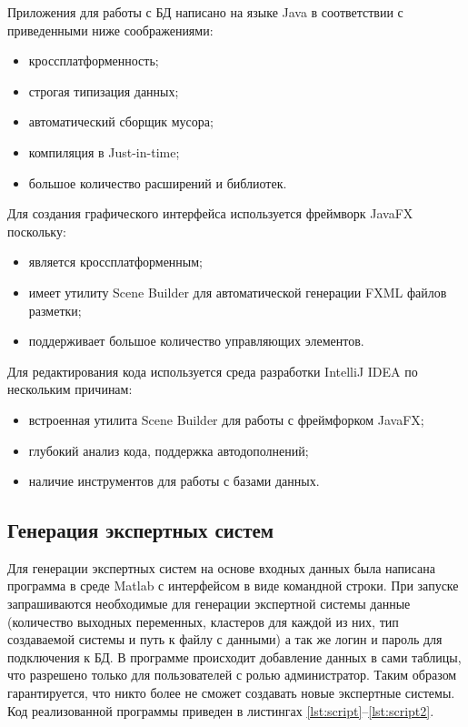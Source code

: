Приложения для работы с БД написано на языке Java \cite{Java} в соответствии с приведенными ниже соображениями:
\begin{itemize}
	\item кроссплатформенность;
	\item строгая типизация данных;
	\item автоматический сборщик мусора;
	\item компиляция в Just-in-time;
	\item большое количество расширений и библиотек.
\end{itemize}

Для создания графического интерфейса используется фреймворк JavaFX поскольку:
\begin{itemize}
	\item является кроссплатформенным;
	\item имеет утилиту Scene Builder для автоматической генерации FXML файлов разметки;
	\item поддерживает большое количество управляющих элементов.
\end{itemize}

Для редактирования кода используется среда разработки IntelliJ IDEA \cite{Idea} по нескольким причинам:
\begin{itemize}
	\item встроенная утилита Scene Builder для работы с фреймфорком JavaFX;
	\item глубокий анализ кода, поддержка автодополнений;
	\item наличие инструментов для работы с базами данных.
\end{itemize}

\subsection{Генерация экспертных систем}
Для генерации экспертных систем на основе входных данных была написана программа в среде Matlab с интерфейсом в виде командной строки. При запуске запрашиваются необходимые для генерации экспертной системы данные (количество выходных переменных, кластеров для каждой из них, тип создаваемой системы и путь к файлу с данными) а так же логин и пароль для подключения к БД. В программе происходит добавление данных в сами таблицы, что разрешено только для пользователей с ролью администратор. Таким образом гарантируется, что никто более не сможет создавать новые экспертные системы. Код реализованной программы приведен в листингах \ref{lst:script}--\ref{lst:script2}.

